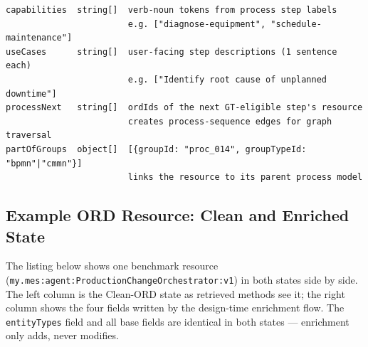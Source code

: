 \begin{lstlisting}[float=!t, floatplacement=!t, basicstyle=\ttfamily\scriptsize, breaklines=true, frame=single, label={lst:enriched_fields}, caption={Enriched-ORD additional fields. Written by \texttt{enrich\_from\_processes.py} for GT-eligible resources only (70/273). Non-GT resources remain at Clean-ORD level.}]
capabilities  string[]  verb-noun tokens from process step labels
                        e.g. ["diagnose-equipment", "schedule-maintenance"]
useCases      string[]  user-facing step descriptions (1 sentence each)
                        e.g. ["Identify root cause of unplanned downtime"]
processNext   string[]  ordIds of the next GT-eligible step's resource
                        creates process-sequence edges for graph traversal
partOfGroups  object[]  [{groupId: "proc_014", groupTypeId: "bpmn"|"cmmn"}]
                        links the resource to its parent process model
\end{lstlisting}


\subsection{Example ORD Resource: Clean and Enriched State}
\label{appendix:landscape-example}

The listing below shows one benchmark resource (\texttt{my.mes:agent:ProductionChangeOrchestrator:v1}) in both states side by side. The left column is the Clean-ORD state as retrieved methods see it; the right column shows the four fields written by the design-time enrichment flow. The \texttt{entityTypes} field and all base fields are identical in both states --- enrichment only adds, never modifies.

